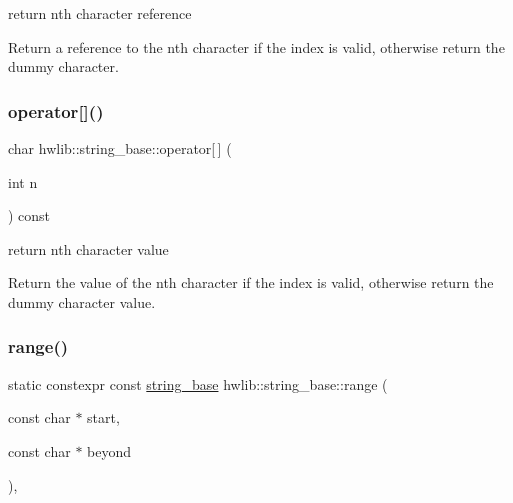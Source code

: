 return n\textquotesingle{}th character reference

Return a reference to the n\textquotesingle{}th character if the index is valid, otherwise return the dummy character. \mbox{\label{classhwlib_1_1string__base_a9b6bbc5ff933b8e9c5458b61d5c73f4e}} 
\subsubsection{\texorpdfstring{operator[]()}{operator[]()}\hspace{0.1cm}{\footnotesize\ttfamily [2/2]}}
{\footnotesize\ttfamily char hwlib\+::string\+\_\+base\+::operator\mbox{[}$\,$\mbox{]} (\begin{DoxyParamCaption}\item[{int}]{n }\end{DoxyParamCaption}) const\hspace{0.3cm}{\ttfamily [inline]}}

return n\textquotesingle{}th character value

Return the value of the n\textquotesingle{}th character if the index is valid, otherwise return the dummy character value. \mbox{\label{classhwlib_1_1string__base_ab7e08e38e685b9e5b1f428a2f06a8351}} 
\subsubsection{\texorpdfstring{range()}{range()}\hspace{0.1cm}{\footnotesize\ttfamily [1/2]}}
{\footnotesize\ttfamily static constexpr const \hyperlink{classhwlib_1_1string__base}{string\+\_\+base} hwlib\+::string\+\_\+base\+::range (\begin{DoxyParamCaption}\item[{const char $\ast$}]{start,  }\item[{const char $\ast$}]{beyond }\end{DoxyParamCaption})\hspace{0.3cm}{\ttfamily [inline]}, {\ttfamily [static]}}

